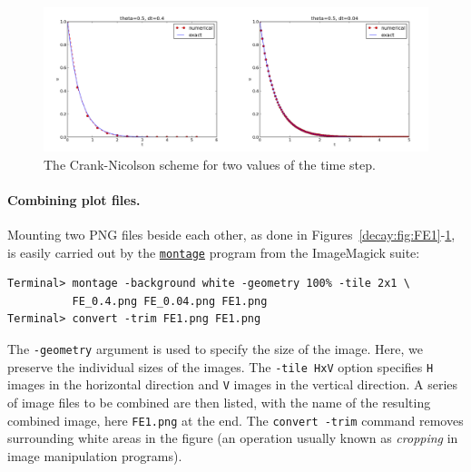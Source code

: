 \documentclass[%
oneside,                 %
final,                   %
10pt]{article}
\begin{document}
\begin{figure}[!ht]  %
  \centerline{\includegraphics[width=1.1\linewidth]{fig-alg/CN1.png}}
  \caption{
  The Crank-Nicolson scheme for two values of the time step. \label{decay:fig:CN1}
  }
\end{figure}




\paragraph{Combining plot files.}
Mounting two PNG files beside each other, as done in Figures~\ref{decay:fig:FE1}-\ref{decay:fig:CN1}, is easily carried out by the
\href{{http://www.imagemagick.org/script/montage.php}}{\nolinkurl{montage}} program
from the ImageMagick suite:

\begin{Verbatim}[frame=lines,label=\fbox{{\tiny Terminal}},framesep=2.5mm,framerule=0.7pt,fontsize=\fontsize{9pt}{9pt}]
Terminal> montage -background white -geometry 100% -tile 2x1 \ 
          FE_0.4.png FE_0.04.png FE1.png
Terminal> convert -trim FE1.png FE1.png
\end{Verbatim}
The \texttt{-geometry} argument is used to specify the size of the image. Here,
we preserve the individual sizes of the images. The \texttt{-tile HxV} option
specifies \texttt{H} images in the horizontal direction and \texttt{V} images in
the vertical direction. A series of image files to be combined are then listed,
with the name of the resulting combined image, here \texttt{FE1.png} at the end.
The \texttt{convert -trim} command removes surrounding white areas in the figure
(an operation usually known as \emph{cropping} in image manipulation programs).

\end{document}
